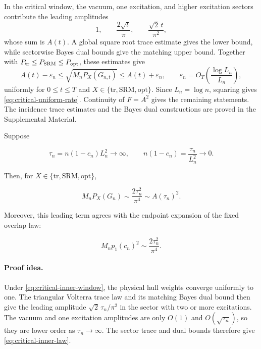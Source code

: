 In the critical window, the vacuum, one excitation, and higher excitation
sectors contribute the leading amplitudes
\[
1,\qquad
\frac{2\sqrt t}{\pi},\qquad
\frac{\sqrt2\,t}{\pi^2},
\]
whose sum is \(A(t)\). A global square root trace estimate gives the lower
bound, while sectorwise Bayes dual bounds give the matching upper bound.
Together with
\(P_{\rm tr}\leq P_{\rm SRM}\leq P_{\rm opt}\), these estimates give
\[
A(t)-\varepsilon_n
\leq
\sqrt{M_nP_X(G_{n,t})}
\leq
A(t)+\varepsilon_n,
\qquad
\varepsilon_n
=
O_T\!\left(\frac{\log L_n}{L_n}\right),
\]
uniformly for \(0\leq t\leq T\) and
\(X\in\{\mathrm{tr},\mathrm{SRM},\mathrm{opt}\}\). Since
\(L_n=\log n\), squaring gives
\eqref{eq:critical-uniform-rate}. Continuity of \(F=A^2\) gives the remaining
statements. The incidence trace estimates and the Bayes dual constructions
are proved in the Supplemental Material.

\begin{lemma}
Suppose

\begin{equation}\label{eq:critical-inner-window}
 \tau_n=n(1-c_n)L_n^2\longrightarrow\infty,
 \qquad n(1-c_n)=\frac{\tau_n}{L_n^2}\longrightarrow0.
\end{equation}

Then, for \(X\in\{\mathrm{tr},\mathrm{SRM},\mathrm{opt}\}\),

\begin{equation}\label{eq:critical-inner-law}
 M_nP_X(G_n)\sim\frac{2\tau_n^2}{\pi^4}\sim A(\tau_n)^2.
\end{equation}

Moreover, this leading term agrees with the endpoint expansion of the
fixed overlap law:

\begin{equation}\label{eq:critical-inner-p1-matching}
 M_np_1(c_n)^2\sim\frac{2\tau_n^2}{\pi^4}.
\end{equation}
\end{lemma}

\paragraph{Proof idea.}
Under \eqref{eq:critical-inner-window}, the physical hull weights converge
uniformly to one. The triangular Volterra trace law and its matching Bayes
dual bound then give the leading amplitude
\(\sqrt2\,\tau_n/\pi^2\) in the sector with two or more excitations. The
vacuum and one excitation amplitudes are only \(O(1)\) and
\(O(\sqrt{\tau_n})\), so they are lower order as \(\tau_n\to\infty\).
The sector trace and dual bounds therefore give
\eqref{eq:critical-inner-law}.

